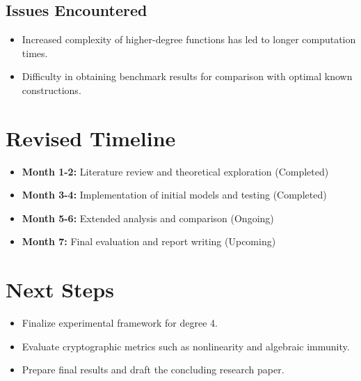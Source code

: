 \documentclass[11pt]{article}
\begin{document}
\subsection{Issues Encountered}
\begin{itemize}
    \item Increased complexity of higher-degree functions has led to longer computation times.
    \item Difficulty in obtaining benchmark results for comparison with optimal known constructions.
\end{itemize}

\section{Revised Timeline}
\begin{itemize}
    \item \textbf{Month 1-2:} Literature review and theoretical exploration (Completed)
    \item \textbf{Month 3-4:} Implementation of initial models and testing (Completed)
    \item \textbf{Month 5-6:} Extended analysis and comparison (Ongoing)
    \item \textbf{Month 7:} Final evaluation and report writing (Upcoming)
\end{itemize}

\section{Next Steps}
\begin{itemize}
    \item Finalize experimental framework for degree 4.
    \item Evaluate cryptographic metrics such as nonlinearity and algebraic immunity.
    \item Prepare final results and draft the concluding research paper.
\end{itemize}
\end{document}
